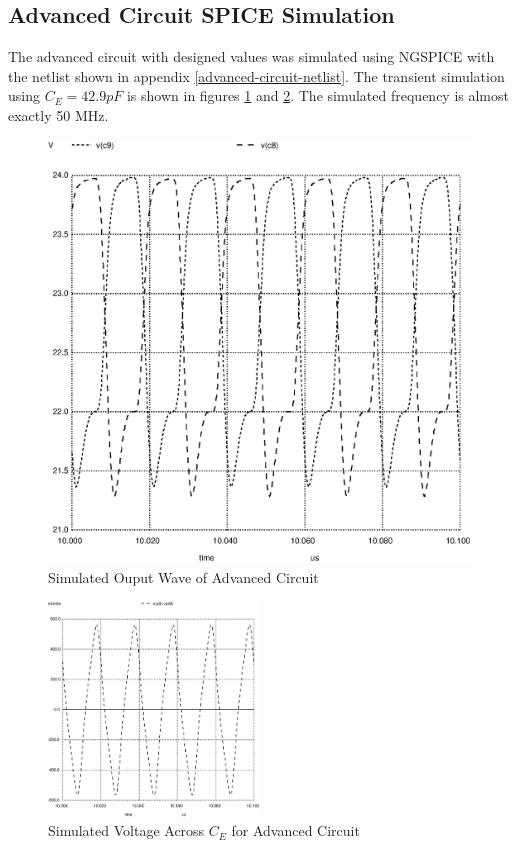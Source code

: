 \documentclass[titlepage, letterpaper, 10.5pt]{article}
\begin{document}
\subsection{Advanced Circuit SPICE Simulation}

The advanced circuit with designed values was simulated using NGSPICE
with the netlist shown in appendix \ref{advanced-circuit-netlist}.
The transient simulation using $C_{E}=42.9pF$ is shown in figures
\ref{advanced-circuit-output-43pF} and \ref{advanced-circuit-vcap-43pF}.
The simulated frequency is almost exactly 50 MHz.

\begin{figure}[ht]
	\centering
	\includegraphics[width=.5\textwidth]{ngspice/advanced-circuit-output-43pF}
	\caption{Simulated Ouput Wave of Advanced Circuit}
	\label{advanced-circuit-output-43pF}
\end{figure}

\begin{figure}[ht]
	\centering
	\includegraphics[width=0.5\textwidth]{ngspice/advanced-circuit-vcap-43pF}
	\caption{Simulated Voltage Across $C_{E}$ for Advanced Circuit}
	\label{advanced-circuit-vcap-43pF}
\end{figure}


\clearpage
\end{document}
